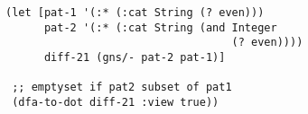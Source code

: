 \begin{lstlisting}[style=reclojureClojure]
(let [pat-1 '(:* (:cat String (? even)))
      pat-2 '(:* (:cat String (and Integer
                                   (? even))))
      diff-21 (gns/- pat-2 pat-1)]

 ;; emptyset if pat2 subset of pat1
 (dfa-to-dot diff-21 :view true))
\end{lstlisting}
